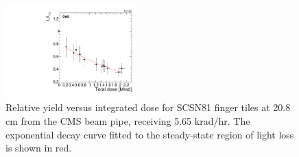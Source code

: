 \begin{figure}[tbp!]
\includegraphics[width=0.45\textwidth]{figures/SCSN81-F-20p8cm-f20ch3-dose.pdf}
\caption{Relative yield versus integrated dose for SCSN81 finger tiles at 20.8 cm from the CMS beam pipe, receiving 5.65 krad/hr. The exponential decay curve fitted to the steady-state region of light loss is shown in red.}
\label{fig:SCSN81-F-20p8cm-dose}
\end{figure} 

